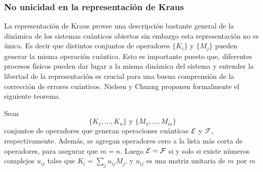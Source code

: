 \subsubsection{No unicidad en la representación de Kraus} %
 La representación de Kraus provee una descripción bastante general de la
dinámica de los sistemas cuánticos abiertos sin embargo esta representación no
es única. Es decir que distintos conjuntos de operadores $\{K_i\}$ y $\{M_j\}$
pueden generar la misma operación cuántica. Esto es importante puesto que,
diferentes procesos físicos pueden dar lugar a la misma dinámica del sistema y
entender la libertad de la representación es crucial para una buena comprensión
de la corrección de errores cuánticos. Nielsen y Chuang
{\cite{nielsen_chuang_2010}} proponen formalmente el siguiente teorema.

\begin{theorem}\label{teorema:Libertad_unitaria}
Sean \[\{K_1,\ldots,K_n\} \text{ y } \{M_1,\ldots , M_m\}\] conjuntos de
operadores que generan operaciones cuánticas $\mathcal{E}$ y $\mathcal{F}$,
respectivamente. Además, se agregan operadores cero a la lista más corta de operadores, para asegurar que $m=n$. Luego $\mathcal{E}=\mathcal{F}$
si y solo si existe números complejos $u_{ij}$ tales que $K_i=\sum_j
u_{ij}M_j$, y $u_{ij}$ es una matriz
unitaria de $m$ por $m$
\end{theorem}


